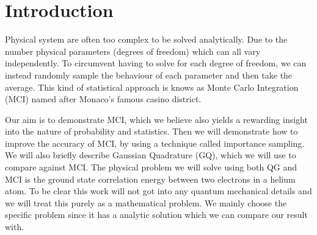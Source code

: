 \section{Introduction}

Physical system are often too complex to be solved analytically. Due to the
number physical parameters (degrees of freedom) which can all vary
independently. To circumvent having to solve for each degree of
freedom, we can instead randomly sample the behaviour of each parameter
and then take the average. This kind of statistical approach is knows as Monte Carlo
Integration (MCI) named after Monaco's famous casino district. 
  
Our aim is to demonstrate MCI, which we believe also yields
a rewarding insight into the nature of probability and statistics.  Then we
will demonstrate how to improve the accuracy of MCI, by
using a technique called importance sampling. We will also briefly describe
Gaussian Quadrature (GQ), which we will use to compare against MCI. The
physical problem we will solve using both QG and MCI is the ground state
correlation energy between two electrons in a helium atom. To be clear this work
will not got into any quantum mechanical details and we will treat this purely
as a mathematical problem. We mainly choose the specific problem since it has a
analytic solution which we can compare our result with. 